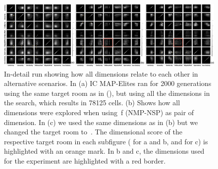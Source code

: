 \begin{figure}[h!]
{%
}
\label{figs:full-expressive}
\end{figure}


\begin{figure}[h!]
\centerline{\includegraphics[width=\textwidth]{figures/figure5.png}}
\caption{In-detail run showing how all dimensions relate to each other in alternative scenarios. In (a) IC MAP-Elites ran for 2000 generations using the same target room as in  (), but using all the dimensions in the search, which results in 78125 cells. (b) Shows how all dimensions were explored when using~f (NMP-NSP) as pair of dimension. In (c) we used the same dimensions as in (b) but we changed the target room to~. The dimensional score of the respective target room in each subfigure ( for a and b, and  for c) is highlighted with an orange mark. In b and c, the dimensions used for the experiment are highlighted with a red border.}
\label{figs:all-dimensions-earun}
\end{figure}


